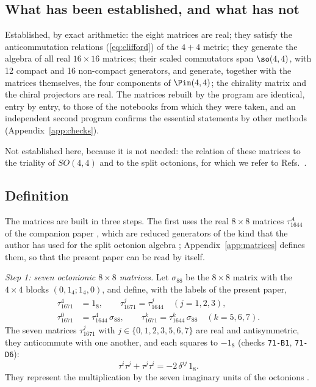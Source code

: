 \subsection{What has been established, and what has not}

Established, by exact arithmetic: the eight matrices are real; they satisfy the anticommutation
relations (\ref{eq:clifford}) of the $4+4$ metric; they generate the algebra of all real
$16\times16$ matrices; their scaled commutators span $\so(4,4)$, with 12 compact and 16 non-compact
generators, and generate, together with the matrices themselves, the four components of $\Pin(4,4)$;
the chirality matrix and the chiral projectors are real. The matrices rebuilt by the program are
identical, entry by entry, to those of the notebooks from which they were taken, and an independent
second program confirms the essential statements by other methods (Appendix~\ref{app:checks}).

Not established here, because it is not needed: the relation of these matrices to the triality of
$SO(4,4)$ and to the split octonions, for which we refer to Refs.~\cite{Nash1990,Nash2010}.
\subsection{Definition}
\label{sec:def}

The matrices are built in three steps. The first uses the real $8\times8$ matrices
$\tau_{1644}^A$ of the companion paper \cite{Companion1644}, which are reduced generators of the kind that the
author has used for the split octonion algebra \cite{Nash1990,Nash2010}; Appendix~\ref{app:matrices}
defines them, so that the present paper can be read by itself.

\emph{Step 1: seven octonionic $8\times8$ matrices.} Let
$\sigma_{88}$ be the $8\times8$ matrix with the $4\times4$ blocks $(0,1_4;1_4,0)$, and define, with
the labels of the present paper,
\begin{align}
\tau_{1671}^4&=1_8,\qquad\tau_{1671}^j=\tau_{1644}^j\quad(j=1,2,3),\nonumber\\
\tau_{1671}^0&=\tau_{1644}^4\,\sigma_{88},\qquad\tau_{1671}^k=\tau_{1644}^k\,\sigma_{88}\quad(k=5,6,7).
\label{eq:tau}
\end{align}
The seven matrices $\tau_{1671}^j$ with $j\in\{0,1,2,3,5,6,7\}$ are real and antisymmetric, they
anticommute with one another, and each squares to $-1_8$ (checks \texttt{71-B1}, \texttt{71-D6}):
\begin{equation}
\tau^i\tau^j+\tau^j\tau^i=-2\,\delta^{ij}\,1_8 .
\label{eq:tauclifford}
\end{equation}
They represent the multiplication by the seven imaginary units of the octonions
\cite{Bryant1982,HarveyLawson1982}.

